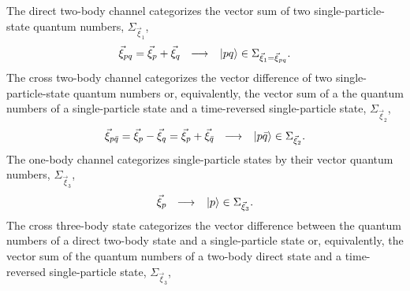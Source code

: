 \documentclass[thesis.tex]{subfiles}
\begin{document}
The direct two-body channel categorizes the vector sum of two single-particle-state quantum numbers, $\Sigma_{\vec{\xi}_{1}}$,
\begin{equation}
  \vec{\xi}_{pq} = \vec{\xi}_{p} + \vec{\xi}_{q}\ \ \longrightarrow\ \ \hspace{1pt}\lvert pq \rangle \in \Sigma_{\vec{\xi}_{1}=\vec{\xi}_{pq}}.
\end{equation}
The cross two-body channel categorizes the vector difference of two single-particle-state quantum numbers or, equivalently, the vector sum of a the quantum numbers of a single-particle state and a time-reversed single-particle state, $\Sigma_{\vec{\xi}_{2}}$,
\begin{equation}
  \vec{\xi}_{p\bar{q}} = \vec{\xi}_{p} - \vec{\xi}_{q} = \vec{\xi}_{p} + \vec{\xi}_{\bar{q}}\ \ \longrightarrow\ \ \ket{p\bar{q}} \in \Sigma_{\vec{\xi}_{2}}.
\end{equation}
The one-body channel categorizes single-particle states by their vector quantum numbers, $\Sigma_{\vec{\xi}_{3}}$,
\begin{equation}
  \vec{\xi}_{p}\ \ \longrightarrow\ \ \hspace{1pt}\lvert p \rangle \in \Sigma_{\vec{\xi}_{3}}.
\end{equation}
The cross three-body state categorizes the vector difference between the quantum numbers of a direct two-body state and a single-particle state or, equivalently, the vector sum of the quantum numbers of a two-body direct state and a time-reversed single-particle state, $\Sigma_{\vec{\xi}_{3}}$,
\end{document}
